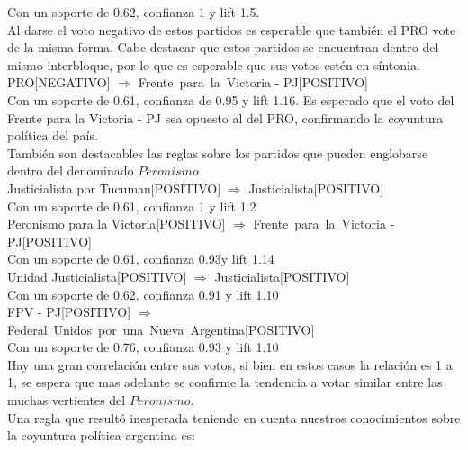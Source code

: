 \documentclass{endm}
\begin{document}
Con un soporte de 0.62, confianza 1 y lift 1.5.\\

Al darse el voto negativo de estos partidos es esperable que también el PRO vote de la misma forma. Cabe destacar que estos partidos se encuentran dentro del mismo interbloque, por lo que es esperable que sus votos estén en síntonia. \\

{PRO[NEGATIVO]}  $\Longrightarrow$ {Frente\ para\ la\ Victoria - PJ[POSITIVO]} \\

Con un soporte de 0.61, confianza de  0.95 y lift 1.16. Es esperado que el voto del Frente para la Victoria - PJ sea opuesto al del PRO, confirmando la coyuntura política del país. \\ 

También son destacables las reglas sobre los partidos que pueden englobarse dentro del denominado $Peronismo$ \\

{Justicialista por Tucuman[POSITIVO]} $\Longrightarrow$ {Justicialista[POSITIVO]} \\

Con un soporte de  0.61, confianza 1 y lift 1.2\\

{Peronismo para la Victoria[POSITIVO]} $\Longrightarrow$ {Frente\ para\ la\ Victoria - PJ[POSITIVO]}  \\

Con un soporte de 0.61, confianza 0.93y lift 1.14\\

{Unidad Justicialista[POSITIVO]}  $\Longrightarrow$ {Justicialista[POSITIVO]} \\

Con un soporte de 0.62, confianza 0.91 y lift 1.10\\

{FPV - PJ[POSITIVO]} $\Longrightarrow$ {Federal\ Unidos\ por\ una\ Nueva\ Argentina[POSITIVO]}\\

Con un soporte de 0.76, confianza 0.93 y lift 1.10\\

Hay una gran correlación entre sus votos, si bien en estos casos la relación es 1 a 1, se espera que mas adelante se confirme la tendencia a votar similar entre las muchas vertientes del $Peronismo$.\\

Una regla que resultó inesperada teniendo en cuenta nuestros conocimientos sobre la coyuntura política argentina es: \\
\end{document}
